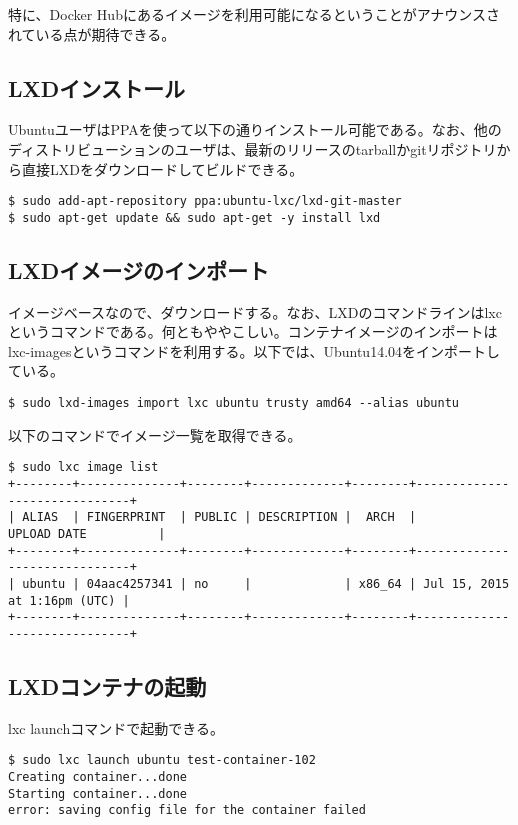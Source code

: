 \documentclass[9pt,b5paper,tombo]{jsbook}
\begin{document}
\noindent
特に、Docker Hubにあるイメージを利用可能になるということがアナウンスされている点が期待できる。


\subsection{LXDインストール}
UbuntuユーザはPPAを使って以下の通りインストール可能である。なお、他のディストリビューションのユーザは、最新のリリースのtarballかgitリポジトリから直接LXDをダウンロードしてビルドできる。
\begin{lstlisting}
$ sudo add-apt-repository ppa:ubuntu-lxc/lxd-git-master
$ sudo apt-get update && sudo apt-get -y install lxd
\end{lstlisting}

\subsection{LXDイメージのインポート}
イメージベースなので、ダウンロードする。なお、LXDのコマンドラインはlxcというコマンドである。何ともややこしい。コンテナイメージのインポートはlxc-imagesというコマンドを利用する。以下では、Ubuntu14.04をインポートしている。

\begin{lstlisting}
$ sudo lxd-images import lxc ubuntu trusty amd64 --alias ubuntu
\end{lstlisting}

\noindent
以下のコマンドでイメージ一覧を取得できる。
\begin{lstlisting}
$ sudo lxc image list
+--------+--------------+--------+-------------+--------+------------------------------+
| ALIAS  | FINGERPRINT  | PUBLIC | DESCRIPTION |  ARCH  |         UPLOAD DATE          |
+--------+--------------+--------+-------------+--------+------------------------------+
| ubuntu | 04aac4257341 | no     |             | x86_64 | Jul 15, 2015 at 1:16pm (UTC) |
+--------+--------------+--------+-------------+--------+------------------------------+
\end{lstlisting}

\newpage

\subsection{LXDコンテナの起動}
lxc launchコマンドで起動できる。
\begin{lstlisting}
$ sudo lxc launch ubuntu test-container-102
Creating container...done
Starting container...done
error: saving config file for the container failed
\end{lstlisting}
\end{document}
